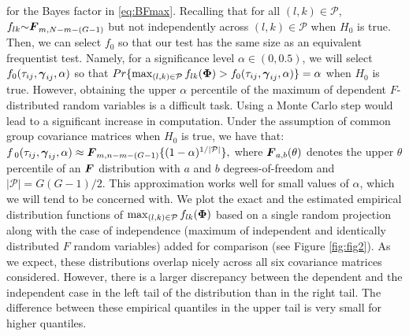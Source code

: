 \documentclass[times,sort&compress,3p]{elsarticle}
\theoremstyle{plain}%
\theoremstyle{definition}
\newcommand{\uF}       {\mbox{\boldmath$F$}}
\newcommand{\ugamma}            {\mbox{\boldmath$\gamma$}}
\newcommand{\uPhi}              {\mbox{\boldmath$\Phi$}}
\begin{document}
for the Bayes factor in \eqref{eq:BFmax}. 
Recalling that for all $(l,k) \in \mathcal{P}$, $f_{lk} {\sim} \uF_{m, N - m- (G-1)}$ but not independently across $(l, k)\in\mathcal{P}$ when $H_0$ is true. Then, we can select $f_{0}$ so that our test has the same size as an equivalent frequentist test. Namely, for a significance level $\alpha \in (0, 0.5)$, we will select $f_0(\tau_{ij},\ugamma_{ij}, \alpha)$ so that 
$Pr\{\max_{(l, k)\in\mathcal{P}}f_{lk}(\uPhi) > f_{0}(\tau_{ij},\ugamma_{ij}, \alpha)\} = \alpha$ when $H_{0}$ is true. However, obtaining the upper $\alpha$ percentile of the maximum of dependent $F$-distributed random variables is a difficult task. Using a Monte Carlo step would lead to a significant increase in computation. Under the assumption of common group covariance matrices when $H_0$ is true, we have that: 
$f_{\;0}(\tau_{ij},\ugamma_{ij}, \alpha) \approx \uF_{m, n -m -(G-1)}\{(1 - \alpha)^{1/|\mathcal{P}|}\},$ where $\uF_{a, b}(\theta)$ denotes the upper $\theta$ percentile of an $\uF$ distribution with $a$ and $b$ degrees-of-freedom and $|\mathcal{P}| = G(G-1)/2$. This approximation works well for small values of $\alpha$, which we will tend to be concerned with. We plot the exact and the estimated empirical distribution functions of $\max_{(l, k)\in\mathcal{P}}f_{lk}(\uPhi)$ based on a single random projection along with the case of independence (maximum of independent and identically distributed $F$ random variables) added for comparison (see Figure \ref{fig:fig2}). As we expect, these distributions overlap nicely across all six covariance matrices considered. However, there is a larger discrepancy between the dependent and the independent case in the left tail of the distribution than in the right tail. The difference between these empirical quantiles in the upper tail is very small for higher quantiles.
\end{document}
